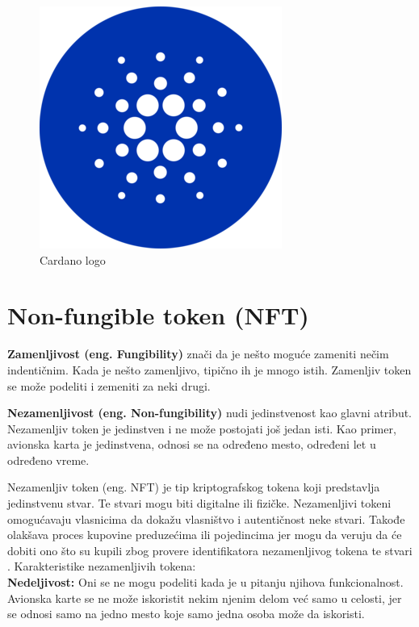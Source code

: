 \documentclass[a4paper]{article}
\begin{document}
{\begin{figure}[h!]
\begin{center}
\includegraphics[scale=0.4]{slike/slika5.png}
\end{center}
\caption{Cardano logo}
\label{fig:cardano} 
\end{figure}


\newpage

\section{Non-fungible token (NFT)}
\label{sec:nft}
\textbf{Zamenljivost (eng. Fungibility)} znači da je nešto moguće zameniti nečim indentičnim. Kada je nešto zamenljivo, tipično ih je mnogo istih. Zamenljiv token se može podeliti i zemeniti za neki drugi.

\textbf{Nezamenljivost (eng. Non-fungibility)} nudi jedinstvenost kao glavni atribut. Nezamenljiv token je jedinstven i ne može postojati još jedan isti. Kao primer, avionska karta je jedinstvena, odnosi se na određeno mesto, određeni let u određeno vreme.

Nezamenljiv token (eng. NFT) je tip kriptografskog tokena koji predstavlja jedinstvenu stvar. Te stvari mogu biti digitalne ili fizičke. Nezamenljivi tokeni omogućavaju vlasnicima da dokažu vlasništvo i autentičnost neke stvari. Takođe olakšava proces kupovine preduzećima ili pojedincima jer mogu da veruju da će dobiti ono što su kupili zbog provere identifikatora nezamenljivog tokena te stvari \cite{nft}. Karakteristike nezamenljivih tokena:\\ 

\textbf{Nedeljivost:} Oni se ne mogu podeliti kada je u pitanju njihova funkcionalnost. Avionska karte se ne može iskoristit nekim njenim delom već samo u celosti, jer se odnosi samo na jedno mesto koje samo jedna osoba može da iskoristi.\\ 

}
\end{document}
